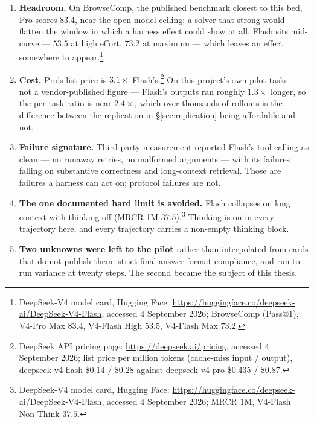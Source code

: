 \begin{enumerate}
  \item \textbf{Headroom.} On BrowseComp, the published benchmark closest
        to this bed, Pro scores $83.4$, near the open-model ceiling; a
        solver that strong would flatten the window in which a harness
        effect could show at all. Flash sits mid-curve --- $53.5$ at high
        effort, $73.2$ at maximum --- which leaves an effect somewhere to
        appear.\footnote{DeepSeek-V4 model card, Hugging Face:
        \url{https://huggingface.co/deepseek-ai/DeepSeek-V4-Flash},
        accessed 4 September 2026; BrowseComp (Pass@1), V4-Pro Max
        $83.4$, V4-Flash High $53.5$, V4-Flash Max $73.2$.}
  \item \textbf{Cost.} Pro's list price is $3.1\times$ Flash's.\footnote{DeepSeek
        API pricing page: \url{https://deepseek.ai/pricing}, accessed 4
        September 2026; list price per million tokens (cache-miss input /
        output), deepseek-v4-flash \$0.14 / \$0.28 against
        deepseek-v4-pro \$0.435 / \$0.87.} On this project's own pilot
        tasks --- not a vendor-published figure --- Flash's outputs ran
        roughly $1.3\times$ longer, so the per-task ratio is near
        $2.4\times$, which over thousands of rollouts is the
        difference between the replication in \S\ref{sec:replication}
        being affordable and not.
  \item \textbf{Failure signature.} Third-party measurement reported
        Flash's tool calling as clean --- no runaway retries, no malformed
        arguments --- with its failures falling on substantive correctness
        and long-context retrieval. Those are failures a harness can act
        on; protocol failures are not.
  \item \textbf{The one documented hard limit is avoided.} Flash collapses
        on long context with thinking off (MRCR-1M $37.5$).\footnote{DeepSeek-V4
        model card, Hugging Face:
        \url{https://huggingface.co/deepseek-ai/DeepSeek-V4-Flash},
        accessed 4 September 2026; MRCR 1M, V4-Flash Non-Think $37.5$.}
        Thinking is on
        in every trajectory here, and every trajectory carries a
        non-empty thinking block.
  \item \textbf{Two unknowns were left to the pilot} rather than
        interpolated from cards that do not publish them: strict
        final-answer format compliance, and run-to-run variance at twenty
        steps. The second became the subject of this thesis.
\end{enumerate}

